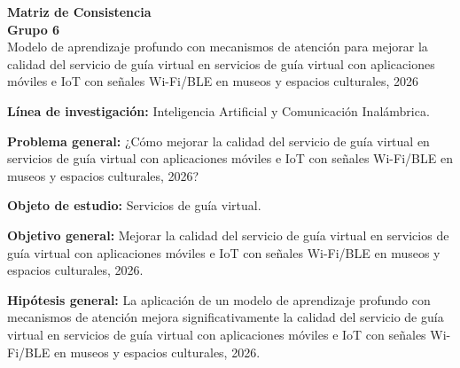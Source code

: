 \documentclass[11pt]{article}
\begin{document}
\begin{center}
{\Large\textbf{Matriz de Consistencia}}\\[0.4em]
{\normalsize\textbf{Grupo 6}}\\[0.3em]
{\normalsize Modelo de aprendizaje profundo con mecanismos de atención para mejorar la calidad del servicio de guía virtual en servicios de guía virtual con aplicaciones móviles e IoT con señales Wi-Fi/BLE en museos y espacios culturales, 2026}
\end{center}

\textbf{Línea de investigación:} Inteligencia Artificial y Comunicación Inalámbrica.

\textbf{Problema general:} ¿Cómo mejorar la calidad del servicio de guía virtual en servicios de guía virtual con aplicaciones móviles e IoT con señales Wi-Fi/BLE en museos y espacios culturales, 2026?

\textbf{Objeto de estudio:} Servicios de guía virtual.

\textbf{Objetivo general:} Mejorar la calidad del servicio de guía virtual en servicios de guía virtual con aplicaciones móviles e IoT con señales Wi-Fi/BLE en museos y espacios culturales, 2026.

\textbf{Hipótesis general:} La aplicación de un modelo de aprendizaje profundo con mecanismos de atención mejora significativamente la calidad del servicio de guía virtual en servicios de guía virtual con aplicaciones móviles e IoT con señales Wi-Fi/BLE en museos y espacios culturales, 2026.
\end{document}
